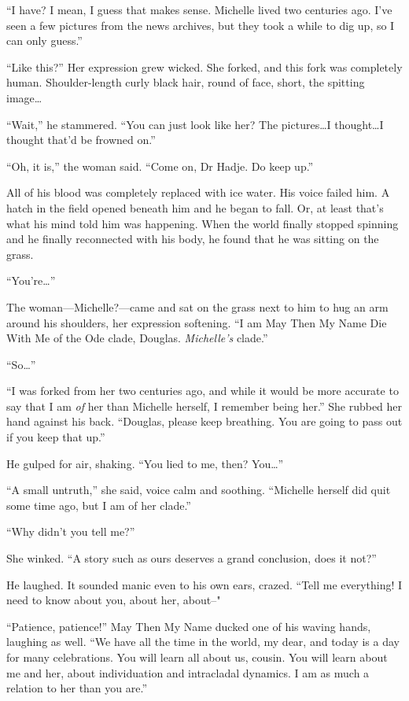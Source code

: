 ``I have? I mean, I guess that makes sense. Michelle lived two centuries ago. I've seen a few pictures from the news archives, but they took a while to dig up, so I can only guess.''

``Like this?'' Her expression grew wicked. She forked, and this fork was completely human. Shoulder-length curly black hair, round of face, short, the spitting image\ldots{}

``Wait,'' he stammered. ``You can just look like her? The pictures\ldots I thought\ldots I thought that'd be frowned on.''

``Oh, it is,'' the woman said. ``Come on, Dr Hadje. Do keep up.''

All of his blood was completely replaced with ice water. His voice failed him. A hatch in the field opened beneath him and he began to fall. Or, at least that's what his mind told him was happening. When the world finally stopped spinning and he finally reconnected with his body, he found that he was sitting on the grass.

``You're\ldots{}''

The woman---Michelle?---came and sat on the grass next to him to hug an arm around his shoulders, her expression softening. ``I am May Then My Name Die With Me of the Ode clade, Douglas. \emph{Michelle's} clade.''

``So\ldots{}''

``I was forked from her two centuries ago, and while it would be more accurate to say that I am \emph{of} her than Michelle herself, I remember being her.'' She rubbed her hand against his back. ``Douglas, please keep breathing. You are going to pass out if you keep that up.''

He gulped for air, shaking. ``You lied to me, then? You\ldots{}''

``A small untruth,'' she said, voice calm and soothing. ``Michelle herself did quit some time ago, but I am of her clade.''

``Why didn't you tell me?''

She winked. ``A story such as ours deserves a grand conclusion, does it not?''

He laughed. It sounded manic even to his own ears, crazed. ``Tell me everything! I need to know about you, about her, about--"

``Patience, patience!'' May Then My Name ducked one of his waving hands, laughing as well. ``We have all the time in the world, my dear, and today is a day for many celebrations. You will learn all about us, cousin. You will learn about me and her, about individuation and intracladal dynamics. I am as much a relation to her than you are.''

